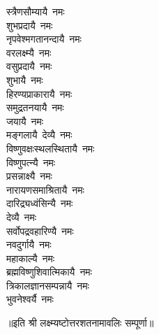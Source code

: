 \begin{multicols}{2}
\begin{flushleft}
स्त्रैणसौम्यायै~नमः\\
शुभप्रदायै~नमः\\
नृपवेश्मगतानन्दायै~नमः\\
वरलक्ष्म्यै~नमः\hfill{}\\
वसुप्रदायै~नमः\\
शुभायै~नमः\\
हिरण्यप्राकारायै~नमः\\
समुद्रतनयायै~नमः\\
जयायै~नमः\\
मङ्गलायै~देव्यै~नमः\\
विष्णुवक्षःस्थलस्थितायै~नमः\\
विष्णुपत्न्यै~नमः\\
प्रसन्नाक्ष्यै~नमः\\
नारायणसमाश्रितायै~नमः\hfill{}\\
दारिद्र्यध्वंसिन्यै~नमः\\
देव्यै~नमः\\
सर्वोपद्रवहारिण्यै~नमः\\
नवदुर्गायै~नमः\\
महाकाल्यै~नमः\\
ब्रह्मविष्णुशिवात्मिकायै~नमः\\
त्रिकालज्ञानसम्पन्नायै~नमः\\
भुवनेश्वर्यै~नमः\\
\end{flushleft}
\end{multicols}
॥इति श्री लक्ष्म्यष्टोत्तरशतनामावलिः सम्पूर्णा॥